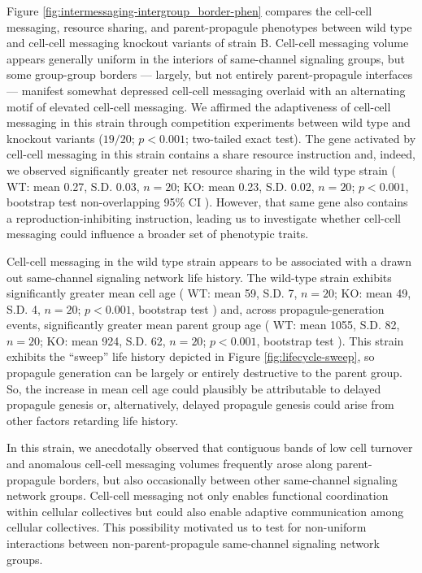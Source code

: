

Figure \ref{fig:intermessaging-intergroup_border-phen} compares the cell-cell messaging, resource sharing, and parent-propagule phenotypes between wild type and cell-cell messaging knockout variants of strain B.
Cell-cell messaging volume appears generally uniform in the interiors of same-channel signaling groups, but some group-group borders --- largely, but not entirely parent-propagule interfaces --- manifest somewhat depressed cell-cell messaging overlaid with an alternating motif of elevated cell-cell messaging.
We affirmed the adaptiveness of cell-cell messaging in this strain through competition experiments between wild type and knockout variants ($19/20$; $p < 0.001$; two-tailed exact test).
The gene activated by cell-cell messaging in this strain contains a share resource instruction and, indeed, we observed significantly greater net resource sharing in the wild type strain
(%
WT: mean 0.27, S.D. 0.03, $n=20$;
KO: mean 0.23, S.D. 0.02, $n=20$;
$p < 0.001$, bootstrap test
non-overlapping 95\% CI%
). %
However, that same gene also contains a reproduction-inhibiting instruction, leading us to investigate whether cell-cell messaging could influence a broader set of phenotypic traits.

Cell-cell messaging in the wild type strain appears to be associated with a drawn out same-channel signaling network life history.
The wild-type strain exhibits significantly greater mean cell age
(%
WT: mean 59, S.D. 7, $n=20$;
KO: mean 49, S.D. 4, $n=20$;
$p < 0.001$, bootstrap test%
) %
and, across propagule-generation events, significantly greater mean parent group age
(%
WT: mean 1055, S.D. 82, $n=20$;
KO: mean 924, S.D. 62, $n=20$;
$p < 0.001$, bootstrap test%
). %
This strain exhibits the ``sweep'' life history depicted in Figure \ref{fig:lifecycle-sweep}, so propagule generation can be largely or entirely destructive to the parent group.
So, the increase in mean cell age could plausibly be attributable to delayed propagule genesis or, alternatively, delayed propagule genesis could arise from other factors retarding life history.

In this strain, we anecdotally observed that contiguous bands of low cell turnover and anomalous cell-cell messaging volumes frequently arose along parent-propagule borders, but also occasionally between other same-channel signaling network groups.
Cell-cell messaging not only enables functional coordination within cellular collectives but could also enable adaptive communication among cellular collectives.
This possibility motivated us to test for non-uniform interactions between non-parent-propagule same-channel signaling network groups.

